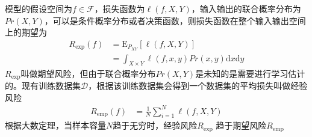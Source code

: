 
模型的假设空间为$f\in \mathcal{F}$，损失函数为$\ell(f,X,Y)$，输入输出的联合概率分布为$Pr(X,Y)$，可以是条件概率分布或者决策函数，则损失函数在整个输入输出空间上的期望为
\begin{equation}\label{Eq: exp loss}
\begin{split}
  R_{\textrm{exp}}(f) &= \mathrm{E}_{P_{XY}}[\ell(f,X,Y)] \\
   &= \int_{X\times Y}\ell(f,x,y)Pr(x,y)\mathrm{d}x\mathrm{d}y
\end{split}
\end{equation}
$R_{\textrm{exp}}$叫做期望风险，但由于联合概率分布$Pr(X,Y)$是未知的是需要进行学习估计的。现有训练数据集$\mathcal{D}$，根据该训练数据集会得到一个数据集的平均损失叫做经验风险
\begin{equation}
\begin{split}
    R_{\textrm{emp}}(f) & = \frac{1}{N}\sum_{i=1}^N \ell(f,X,Y)
\end{split}
\end{equation}
根据大数定理，当样本容量$N$趋于无穷时，经验风险$R_{\textrm{exp}}$ 趋于期望风险$R_{\textrm{emp}}$

